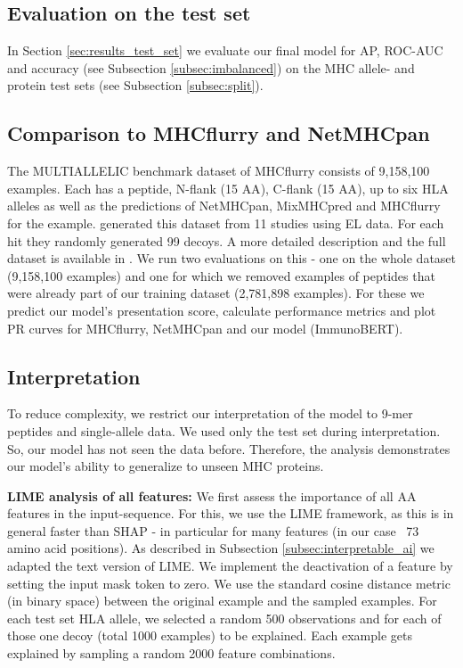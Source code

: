 \documentclass[msc,deptreport,ai]{infthesis} %
\begin{document}
		\subsection{Evaluation on the test set}
		In Section \ref{sec:results_test_set} we evaluate our final model for \gls{AP}, \gls{ROC}-\gls{AUC} and accuracy (see Subsection \ref{subsec:imbalanced}) on the \gls{MHC} allele- and protein test sets (see Subsection \ref{subsec:split}).
		
		\subsection{Comparison to MHCflurry and NetMHCpan}
		\label{subsec:method_comparison}
		The MULTIALLELIC benchmark dataset of MHCflurry consists of 9,158,100 examples. Each has a peptide, N-flank (15 \gls{AA}), C-flank (15 \gls{AA}), up to six \gls{HLA} alleles as well as the predictions of NetMHCpan, MixMHCpred and MHCflurry for the example. \cite{odonnell_mhcflurry_2020} generated this dataset from 11 studies using \gls{EL} data. For each hit they randomly generated 99 decoys. A more detailed description and the full dataset is available in \cite[Supplement Data S1]{odonnell_mhcflurry_2020}. We run two evaluations on this - one on the whole dataset (9,158,100 examples) and one for which we removed examples of peptides that were already part of our training dataset (2,781,898 examples). For these we predict our model's presentation score, calculate performance metrics and plot \gls{PR} curves for MHCflurry, NetMHCpan and our model (ImmunoBERT).
		
		\subsection{Interpretation}
		\label{subsec:method_Interpretation}
			To reduce complexity, we restrict our interpretation of the model to 9-mer peptides and single-allele data. We used only the test set during interpretation. So, our model has not seen the data before. Therefore, the analysis demonstrates our model's ability to generalize to unseen \gls{MHC} proteins.

			\noindent \textbf{LIME analysis of all features:} We first assess the importance of all \gls{AA} features in the input-sequence. For this, we use the \gls{LIME} framework, as this is in general faster than \gls{SHAP} - in particular for many features (in our case ~73 amino acid positions). As described in Subsection \ref{subsec:interpretable_ai} we adapted the text version of \gls{LIME}. We implement the deactivation of a feature by setting the input mask token to zero. We use the standard cosine distance metric (in binary space) between the original example and the sampled examples. For each test set \gls{HLA} allele, we selected a random 500 observations and for each of those one decoy (total 1000 examples) to be explained. Each example gets explained by sampling a random 2000 feature combinations.
\end{document}
